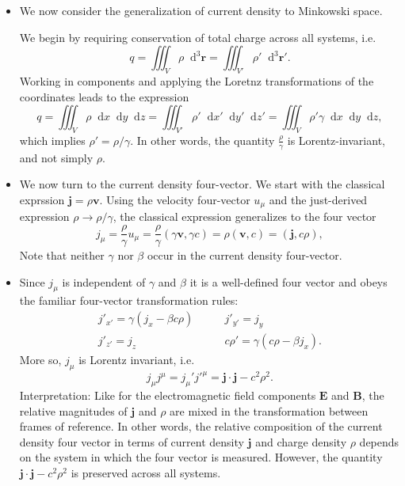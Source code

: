 \documentclass[11pt, a4paper]{article}
\newcommand{\diff}{\mathop{}\!\mathrm{d}} %
\newcommand{\dr}{\diff^{3} \r}  %
\renewcommand{\vec}[1]{\bm{#1}} %
\renewcommand{\r}{\vec{r}}
\newcommand{\E}{\vec{E}} %
\newcommand{\B}{\vec{B}} %
\renewcommand{\j}{\vec{j}}  %
\begin{document}
\begin{itemize}
	\item We now consider the generalization of current density to Minkowski space. 

    We begin by requiring conservation of total charge across all systems, i.e. 
	\begin{equation*}
		q = \iiint_{V} \rho \dr = \iiint_{V'} \rho' \dr'.
	\end{equation*}
	Working in components and applying the Loretnz transformations of the coordinates leads to the expression
	\begin{equation*}
		q = \iiint_{V}\rho \diff x \diff y \diff z = \iiint_{V'}\rho' \diff x' \diff y' \diff z' = \iiint_{V}\rho' \gamma \diff x \diff y \diff z,
	\end{equation*}
	which implies $ \rho' = \rho/\gamma $. In other words, the quantity $ \frac{\rho}{\gamma} $ is Lorentz-invariant, and not simply $ \rho $.
	
	\item We now turn to the current density four-vector. We start with the classical exprssion $ \j = \rho \vec{v} $. Using the velocity four-vector $ u_{\mu} $ and the just-derived expression $ \rho \to \rho/\gamma $, the classical expression generalizes to the four vector
	\begin{equation*}
		j_{\mu} = \frac{\rho}{\gamma} u_{\mu} = \frac{\rho}{\gamma}\left(\gamma \vec{v}, \gamma c\right) = \rho(\vec{v}, c) = (\j, c\rho),
	\end{equation*}
    Note that neither $ \gamma $ nor $ \beta $ occur in the current density four-vector.
	
	\item Since $ j_{\mu} $ is independent of $ \gamma $ and $ \beta $ it is a well-defined four vector and obeys the familiar four-vector transformation rules:
	\begin{equation*}
        \begin{array}{ll}
            j'_{x'} = \gamma (j_{x} - \beta c \rho) & \qquad j'_{y'} = j_{y}\\
            j'_{z'} = j_{z} &  \qquad c \rho' = \gamma(c \rho - \beta j_{x}).
        \end{array}
	\end{equation*}
	More so, $ j_{\mu} $ is Lorentz invariant, i.e. 
	\begin{equation*}
		j_{\mu}j^{\mu} = j_{\mu}'j'^{\mu} = \j \cdot \j - c^{2}\rho^{2}.
	\end{equation*}
    Interpretation: Like for the electromagnetic field components $ \E $ and $ \B $, the relative magnitudes of $ \j $ and $ \rho $ are mixed in the transformation between frames of reference. In other words, the relative composition of the current density four vector in terms of current density $ \j $ and charge density $ \rho $ depends on the system in which the four vector is measured. However, the quantity $ \j \cdot \j - c^{2}\rho^{2} $ is preserved across all systems.


\end{itemize}
\end{document}
